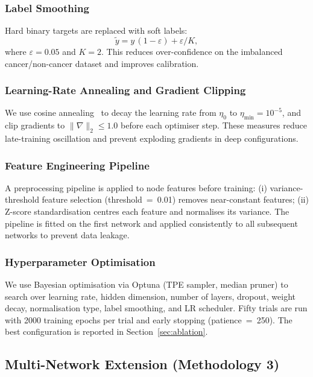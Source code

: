\subsubsection{Label Smoothing}
Hard binary targets are replaced with soft labels:
\begin{equation}
  \tilde{y} = y\,(1 - \varepsilon) + \varepsilon / K,
  \label{eq:labelsmoothing}
\end{equation}
where $\varepsilon = 0.05$ and $K = 2$. This reduces over-confidence on the imbalanced
cancer/non-cancer dataset and improves calibration.

\subsubsection{Learning-Rate Annealing and Gradient Clipping}
We use cosine annealing~\cite{cosine2017} to decay the learning rate from $\eta_0$ to
$\eta_{\min} = 10^{-5}$, and clip gradients to $\|\nabla\|_2 \le 1.0$ before each
optimiser step. These measures reduce late-training oscillation and prevent exploding
gradients in deep configurations.

\subsubsection{Feature Engineering Pipeline}
A preprocessing pipeline is applied to node features before training:
(i) variance-threshold feature selection (threshold~=~0.01) removes near-constant
features; (ii) Z-score standardisation centres each feature and normalises its variance.
The pipeline is fitted on the first network and applied consistently to all subsequent
networks to prevent data leakage.

\subsubsection{Hyperparameter Optimisation}
We use Bayesian optimisation via Optuna (TPE sampler, median pruner) to search over
learning rate, hidden dimension, number of layers, dropout, weight decay, normalisation
type, label smoothing, and LR scheduler. Fifty trials are run with 2000 training epochs
per trial and early stopping (patience~=~250). The best configuration is reported in
Section~\ref{sec:ablation}.

\subsection{Multi-Network Extension (Methodology 3)}

